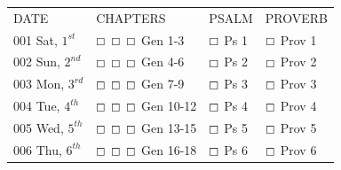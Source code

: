 \documentclass[10pt,landscape,twocolumn,letterpaper]{article}
\begin{document}
\begin{tabular}{p{0.8in}p{1.3in}p{1.2in}p{1.2in}}
DATE & CHAPTERS & PSALM & PROVERB \\
\tiny 001 \normalsize Sat, $1^{st}$ & $\boxempty$ $\boxempty$ $\boxempty$ \hspace{.05in} \textcolor[rgb]{1.00,0.00,0.00}{Gen 1-3} & $\boxempty$ \hspace{.05in} \textcolor[rgb]{0.00,1.00,0.00}{Ps 1} &  $\boxempty$ \hspace{.05in} \textcolor[rgb]{0.00,0.00,1.00}{Prov 1}   \\

\tiny 002 \normalsize Sun, $2^{nd}$ & $\boxempty$ $\boxempty$ $\boxempty$ \hspace{.05in} \textcolor[rgb]{1.00,0.00,0.00}{Gen 4-6} & $\boxempty$ \hspace{.05in} \textcolor[rgb]{0.00,1.00,0.00}{Ps 2} &  $\boxempty$ \hspace{.05in} \textcolor[rgb]{0.00,0.00,1.00}{Prov 2}   \\

\tiny 003 \normalsize Mon, $3^{rd}$ & $\boxempty$ $\boxempty$ $\boxempty$ \hspace{.05in} \textcolor[rgb]{1.00,0.00,0.00}{Gen 7-9} & $\boxempty$ \hspace{.05in} \textcolor[rgb]{0.00,1.00,0.00}{Ps 3} &  $\boxempty$ \hspace{.05in} \textcolor[rgb]{0.00,0.00,1.00}{Prov 3}   \\

\tiny 004 \normalsize Tue, $4^{th}$ & $\boxempty$ $\boxempty$ $\boxempty$ \hspace{.05in} \textcolor[rgb]{1.00,0.00,0.00}{Gen 10-12} & $\boxempty$ \hspace{.05in} \textcolor[rgb]{0.00,1.00,0.00}{Ps 4} &  $\boxempty$ \hspace{.05in} \textcolor[rgb]{0.00,0.00,1.00}{Prov 4}   \\

\tiny 005 \normalsize Wed, $5^{th}$ & $\boxempty$ $\boxempty$ $\boxempty$ \hspace{.05in} \textcolor[rgb]{1.00,0.00,0.00}{Gen 13-15} & $\boxempty$ \hspace{.05in} \textcolor[rgb]{0.00,1.00,0.00}{Ps 5} &  $\boxempty$ \hspace{.05in} \textcolor[rgb]{0.00,0.00,1.00}{Prov 5}   \\

\tiny 006 \normalsize Thu, $6^{th}$ & $\boxempty$ $\boxempty$ $\boxempty$ \hspace{.05in} \textcolor[rgb]{1.00,0.00,0.00}{Gen 16-18} & $\boxempty$ \hspace{.05in} \textcolor[rgb]{0.00,1.00,0.00}{Ps 6} & $\boxempty$ \hspace{.05in} \textcolor[rgb]{0.00,0.00,1.00}{Prov 6}  \\


\end{tabular}
\end{document}
